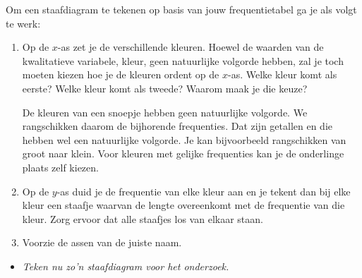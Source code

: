 \documentclass[11pt]{article}
\newcommand{\vraag}[2]{\begin{itemize}\item {\it #1} \vspace*{#2}\end{itemize}}
\begin{document}
Om een staafdiagram te tekenen op basis van jouw frequentietabel ga je als volgt te werk:
\begin{enumerate}
  \item Op de $x$-as zet je de verschillende kleuren. Hoewel de waarden van de kwalitatieve variabele, kleur, geen natuurlijke volgorde hebben, zal je toch moeten kiezen hoe je de kleuren ordent op de $x$-as. Welke kleur komt als eerste? Welke kleur komt als tweede? Waarom maak je die keuze?

De kleuren van een snoepje hebben geen natuurlijke volgorde. We rangschikken daarom de
bijhorende frequenties. Dat zijn getallen en die hebben wel een natuurlijke volgorde. Je kan
bijvoorbeeld rangschikken van groot naar klein. Voor kleuren met gelijke frequenties kan je
de onderlinge plaats zelf kiezen.
\item Op de $y$-as duid je de frequentie van elke kleur aan en je tekent dan bij elke kleur een staafje
waarvan de lengte overeenkomt met de frequentie van die kleur. Zorg ervoor dat alle staafjes
los van elkaar staan.
\item Voorzie de assen van de juiste naam.
\end{enumerate}

\vraag{Teken nu zo’n staafdiagram voor het onderzoek.}{0cm}
\begin{center}

\end{center}
\end{document}
